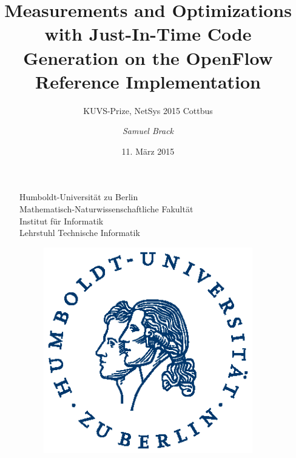 \documentclass[xcolor=x11names,compress]{beamer}
\renewcommand{\(}{\begin{columns}}
\renewcommand{\)}{\end{columns}}
\newcommand{\<}[1]{\begin{column}{#1}}
\renewcommand{\>}{\end{column}}
\begin{document}
\begin{frame}
  \begin{figure}
    \begin{minipage}[c]{0.6\textwidth} 
    \tiny{Humboldt-Universität zu Berlin\\Mathematisch-Naturwissenschaftliche Fakultät\\Institut für Informatik\\Lehrstuhl Technische Informatik}
    \end{minipage}
    \hfill
    \begin{minipage}[c]{0.15\textwidth}
    \begin{figure}
      \includegraphics[width=\textwidth]{figures/HU_Logo}
    \end{figure}
    \end{minipage}
  \end{figure}

\title{\textbf{Measurements and Optimizations with Just-In-Time Code Generation on the OpenFlow Reference Implementation}}
\subtitle{KUVS-Prize, NetSys 2015 Cottbus}

\author{
  \vspace*{-1cm}
	\normalsize{\it Samuel Brack}\\
}
\date{11. März 2015}
\titlepage
\end{frame}
\end{document}
